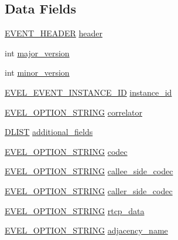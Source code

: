 \subsection*{Data Fields}
\begin{DoxyCompactItemize}
\item 
\hyperlink{evel_8h_aa0ea94c675729365ea7825c4fc7e06d8}{E\+V\+E\+N\+T\+\_\+\+H\+E\+A\+D\+ER} \hyperlink{structevent__service_a3706063c56d2ed4ba03d6cb807dc384f}{header}
\item 
int \hyperlink{structevent__service_a015b00917f55574c6783389139806629}{major\+\_\+version}
\item 
int \hyperlink{structevent__service_a9376bab79a517d8ae680e2219f94a864}{minor\+\_\+version}
\item 
\hyperlink{evel_8h_a4569c7e4bcb933caf47237a323d7c872}{E\+V\+E\+L\+\_\+\+E\+V\+E\+N\+T\+\_\+\+I\+N\+S\+T\+A\+N\+C\+E\+\_\+\+ID} \hyperlink{structevent__service_a8c492b6b28615086932fac3986241dd9}{instance\+\_\+id}
\item 
\hyperlink{evel_8h_a0de5113a7b72de93c0c7b644f7ea7ec3}{E\+V\+E\+L\+\_\+\+O\+P\+T\+I\+O\+N\+\_\+\+S\+T\+R\+I\+NG} \hyperlink{structevent__service_a662010334edc7ec24f65048d83a80f30}{correlator}
\item 
\hyperlink{double__list_8h_a45f4a129042d9e1aa4ffd31fe13e4d14}{D\+L\+I\+ST} \hyperlink{structevent__service_aa95b69a459b3132bc86fc3961cf3cf99}{additional\+\_\+fields}
\item 
\hyperlink{evel_8h_a0de5113a7b72de93c0c7b644f7ea7ec3}{E\+V\+E\+L\+\_\+\+O\+P\+T\+I\+O\+N\+\_\+\+S\+T\+R\+I\+NG} \hyperlink{structevent__service_a123a9d7e97fd49b1c5438cbdf2b95e09}{codec}
\item 
\hyperlink{evel_8h_a0de5113a7b72de93c0c7b644f7ea7ec3}{E\+V\+E\+L\+\_\+\+O\+P\+T\+I\+O\+N\+\_\+\+S\+T\+R\+I\+NG} \hyperlink{structevent__service_a1ce1a5cbe06b287f416da7f9516c89f9}{callee\+\_\+side\+\_\+codec}
\item 
\hyperlink{evel_8h_a0de5113a7b72de93c0c7b644f7ea7ec3}{E\+V\+E\+L\+\_\+\+O\+P\+T\+I\+O\+N\+\_\+\+S\+T\+R\+I\+NG} \hyperlink{structevent__service_a0af781f10c9899163f8cd0b497cde82b}{caller\+\_\+side\+\_\+codec}
\item 
\hyperlink{evel_8h_a0de5113a7b72de93c0c7b644f7ea7ec3}{E\+V\+E\+L\+\_\+\+O\+P\+T\+I\+O\+N\+\_\+\+S\+T\+R\+I\+NG} \hyperlink{structevent__service_a97bdd5bde33a8c772c20f8183d550206}{rtcp\+\_\+data}
\item 
\hyperlink{evel_8h_a0de5113a7b72de93c0c7b644f7ea7ec3}{E\+V\+E\+L\+\_\+\+O\+P\+T\+I\+O\+N\+\_\+\+S\+T\+R\+I\+NG} \hyperlink{structevent__service_a7a0d5763c2bf8ad8a180f54d4427fa7e}{adjacency\+\_\+name}

\end{DoxyCompactItemize}
